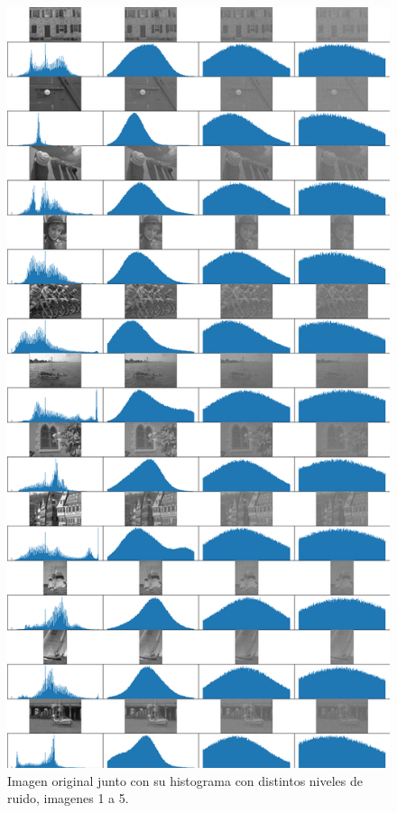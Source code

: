 \begin{figure}
    \centering
    \includegraphics[width=\textwidth]{figuras/img_hist_noise_1.png}
    \caption{Imagen original junto con su histograma con distintos niveles de ruido, imagenes 1 a 5.}
\end{figure}


